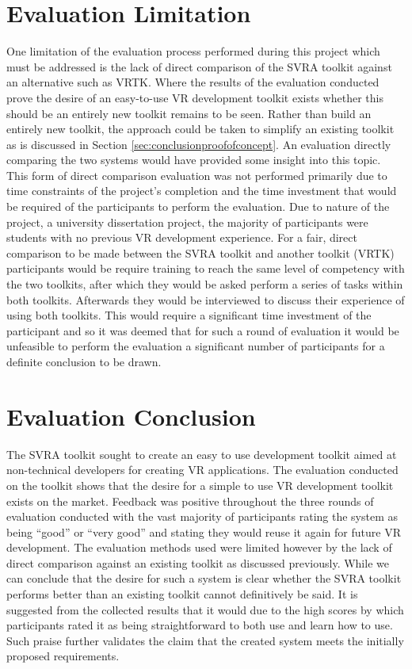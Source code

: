 \documentclass{l4proj}
\begin{document}
\section{Evaluation Limitation}
\label{sec:evaluationlimitation}
One limitation of the evaluation process performed during this project which must be addressed is the lack of direct comparison of the SVRA toolkit against an alternative such as VRTK. Where the results of the evaluation conducted prove the desire of an easy-to-use VR development toolkit exists whether this should be an entirely new toolkit remains to be seen. Rather than build an entirely new toolkit, the approach could be taken to simplify an existing toolkit as is discussed in Section \ref{sec:conclusionproofofconcept}. An evaluation directly comparing the two systems would have provided some insight into this topic. This form of direct comparison evaluation was not performed primarily due to time constraints of the project's completion and the time investment that would be required of the participants to perform the evaluation. Due to nature of the project, a university dissertation project, the majority of participants were students with no previous VR development experience. For a fair, direct comparison to be made between the SVRA toolkit and another toolkit (VRTK) participants would be require training to reach the same level of competency with the two toolkits, after which they would be asked perform a series of tasks within both toolkits. Afterwards they would be interviewed to discuss their experience of using both toolkits. This would require a significant time investment of the participant and so it was deemed that for such a round of evaluation it would be unfeasible to perform the evaluation a significant number of participants for a definite conclusion to be drawn.

\section{Evaluation Conclusion}
\label{sec:evaluationconclusion}
The SVRA toolkit sought to create an easy to use development toolkit aimed at non-technical developers for creating VR applications. The evaluation conducted on the toolkit shows that the desire for a simple to use VR development toolkit exists on the market. Feedback was positive throughout the three rounds of evaluation conducted with the vast majority of participants rating the system as being ``good'' or ``very good'' and stating they would reuse it again for future VR development. The evaluation methods used were limited however by the lack of direct comparison against an existing toolkit as discussed previously. While we can conclude that the desire for such a system is clear whether the SVRA toolkit performs better than an existing toolkit cannot definitively be said. It is suggested from the collected results that it would due to the high scores by which participants rated it as being straightforward to both use and learn how to use. Such praise further validates the claim that the created system meets the initially proposed requirements. 
\end{document}
